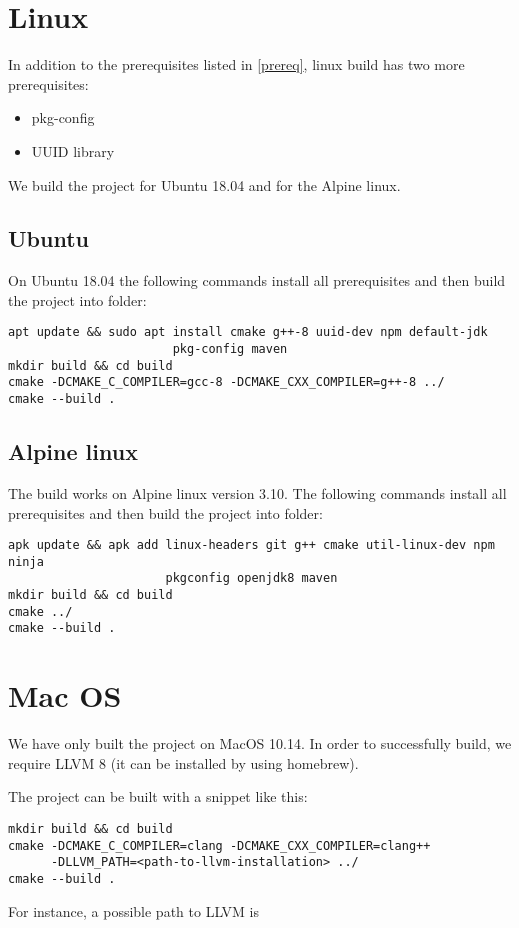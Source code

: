 \section{Linux}

In addition to the prerequisites listed in \cref{prereq}, linux build has two more prerequisites:

\begin{itemize}
	\item pkg-config
	\item UUID library
\end{itemize}


We build the project for Ubuntu 18.04 and for the Alpine linux.
\subsection{Ubuntu}
On Ubuntu 18.04 the following commands install all prerequisites and then build the project into  folder:

\begin{verbatim}
apt update && sudo apt install cmake g++-8 uuid-dev npm default-jdk
                       pkg-config maven
mkdir build && cd build
cmake -DCMAKE_C_COMPILER=gcc-8 -DCMAKE_CXX_COMPILER=g++-8 ../
cmake --build .
\end{verbatim}


\subsection{Alpine linux}

The build works on Alpine linux version 3.10. The following commands install all prerequisites and then build the project into  folder:
\begin{verbatim}
apk update && apk add linux-headers git g++ cmake util-linux-dev npm ninja
                      pkgconfig openjdk8 maven
mkdir build && cd build
cmake ../
cmake --build .
\end{verbatim}


\section{Mac OS}
We have only built the project on MacOS 10.14. In order to successfully build, we require LLVM 8 (it can be installed by using homebrew).

The project can be built with a snippet like this:
\begin{verbatim}
mkdir build && cd build
cmake -DCMAKE_C_COMPILER=clang -DCMAKE_CXX_COMPILER=clang++
      -DLLVM_PATH=<path-to-llvm-installation> ../
cmake --build .
\end{verbatim}
For instance, a possible path to LLVM is 